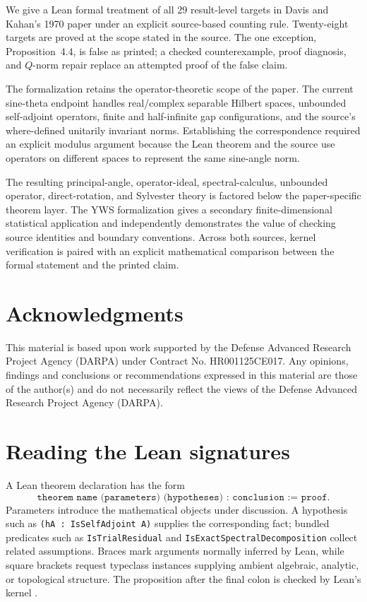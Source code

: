 \documentclass[11pt]{article}
\newcommand{\DKResultCount}{29}
\begin{document}
We give a Lean formal treatment of all \DKResultCount{} result-level targets in
Davis and Kahan's 1970 paper under an explicit source-based counting rule.
Twenty-eight targets are proved at the scope stated in the source.  The one
exception, Proposition~4.4, is false as printed; a checked counterexample,
proof diagnosis, and $Q$-norm repair replace an attempted proof of the false
claim.

The formalization retains the operator-theoretic scope of the paper.  The
current sine-theta endpoint handles
real/complex separable Hilbert spaces, unbounded self-adjoint operators,
finite and half-infinite gap configurations, and the source's where-defined
unitarily invariant norms.  Establishing the correspondence required an
explicit modulus argument because the Lean theorem and the source use operators
on different spaces to represent the same sine-angle norm.

The resulting principal-angle, operator-ideal, spectral-calculus, unbounded
operator, direct-rotation, and Sylvester theory is factored below the
paper-specific theorem layer.  The YWS formalization gives a secondary
finite-dimensional statistical application and independently demonstrates the
value of checking source identities and boundary conventions.  Across both
sources, kernel verification is paired with an explicit mathematical comparison
between the formal statement and the printed claim.

\section*{Acknowledgments}

This material is based upon work supported by the Defense Advanced Research
Project Agency (DARPA) under Contract No. HR001125CE017. Any opinions, findings
and conclusions or recommendations expressed in this material are those of the
author(s) and do not necessarily reflect the views of the Defense Advanced
Research Project Agency (DARPA).




\clearpage
\appendix

\section{Reading the Lean signatures}
\label{app:lean-guide}
\label{app:reading-lean}

A Lean theorem declaration has the form
\[
  \texttt{theorem name (parameters) (hypotheses) : conclusion := proof}.
\]
Parameters introduce the mathematical objects under discussion.  A hypothesis
such as \texttt{(hA : IsSelfAdjoint A)} supplies the corresponding fact;
bundled predicates such as \texttt{IsTrialResidual} and
\texttt{IsExactSpectralDecomposition} collect related assumptions.  Braces mark
arguments normally inferred by Lean, while square brackets request typeclass
instances supplying ambient algebraic, analytic, or topological structure.  The
proposition after the final colon is checked by Lean's kernel
\citep{demoura2021lean4}.
\end{document}
